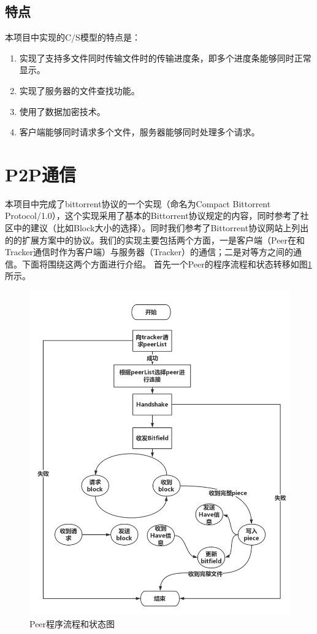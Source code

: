 \documentclass[15pt]{ctexart}
\begin{document}
\subsection{特点} %
\label{sub:特点}
本项目中实现的C/S模型的特点是：
\begin{enumerate}
	\item 实现了支持多文件同时传输文件时的传输进度条，即多个进度条能够同时正常显示。
	\item 实现了服务器的文件查找功能。
	\item 使用了数据加密技术。
	\item 客户端能够同时请求多个文件，服务器能够同时处理多个请求。
\end{enumerate}


\section{P2P通信} %
\label{sec:p2p通信}
	本项目中完成了bittorrent协议的一个实现（命名为Compact Bittorrent Protocol/1.0），这个实现采用了基本的Bittorrent协议规定的内容，同时参考了社区中的建议（比如Block大小的选择）。同时我们参考了Bittorrent协议网站上列出的的扩展方案中的协议。我们的实现主要包括两个方面，一是客户端（Peer在和Tracker通信时作为客户端）与服务器（Tracker）的通信；二是对等方之间的通信。下面将围绕这两个方面进行介绍。
	首先一个Peer的程序流程和状态转移如图\ref{fig:peer}所示。
	\begin{figure}[H]
		\centering
		\includegraphics[scale=0.3]{imgs/peer.png}
		\caption{Peer程序流程和状态图}
		\label{fig:peer}
	\end{figure}
\end{document}
